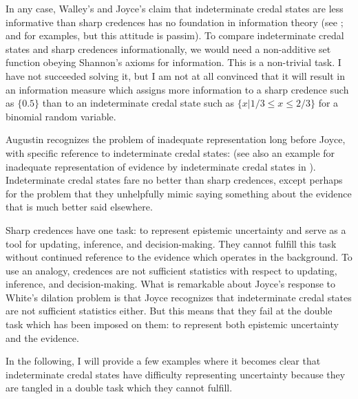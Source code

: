 In any case, Walley's and Joyce's claim that
indeterminate credal states are less informative than
sharp credences has no foundation in information theory
(see ; and
 for examples, but this attitude
is passim). To compare indeterminate credal states and
sharp credences informationally, we would need a
non-additive set function obeying Shannon's axioms for
information. This is a non-trivial task. I have not
succeeded solving it, but I am not at all convinced
that it will result in an information measure which
assigns more information to a sharp credence such as
$\{0.5\}$ than to an indeterminate credal state such as
$\{x|1/3\leq{}x\leq{}2/3\}$ for a binomial random
variable.

Augustin recognizes the problem of inadequate
representation long before Joyce, with specific
reference to indeterminate credal states: 
 (see also an example for
inadequate representation of evidence by indeterminate
credal states in ).
Indeterminate credal states fare no better than sharp
credences, except perhaps for the problem that they
unhelpfully mimic saying something about the evidence
that is much better said elsewhere.

Sharp credences have one task: to represent epistemic
uncertainty and serve as a tool for updating,
inference, and decision-making. They cannot fulfill
this task without continued reference to the evidence
which operates in the background. To use an analogy,
credences are not sufficient statistics with respect to
updating, inference, and decision-making. What is
remarkable about Joyce's response to White's dilation
problem is that Joyce recognizes that indeterminate
credal states are not sufficient statistics either. But
this means that they fail at the double task which has
been imposed on them: to represent both epistemic
uncertainty and the evidence.

In the following, I will provide a few examples where
it becomes clear that indeterminate credal states have
difficulty representing uncertainty because they are
tangled in a double task which they cannot fulfill.


